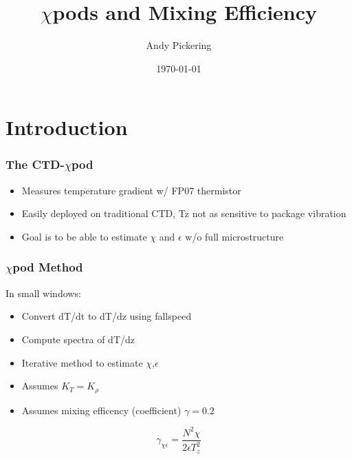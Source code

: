 \documentclass{beamer}
\title{$\chi$pods and Mixing Efficiency}
\author{Andy Pickering}
\date{\today}
\begin{document}
\frame{\titlepage}

\section[Outline]{}
\frame{\tableofcontents}


\section{Introduction}


\begin{frame}
 \frametitle{The CTD-$\chi$pod}

   \begin{itemize}
  \item Measures temperature gradient w/ FP07 thermistor
  \item Easily deployed on traditional CTD, Tz not as sensitive to package vibration
  \item Goal is to be able to estimate $\chi$ and $\epsilon$ w/o full microstructure
  \end{itemize}

\end{frame}


\begin{frame}
 \frametitle{$\chi$pod Method}

In small windows:
   \begin{itemize}
  \item Convert dT/dt to dT/dz using fallspeed
  \item  Compute spectra of dT/dz
  \item Iterative method to estimate $\chi$,$\epsilon$
  \item Assumes $K_T=K_{\rho}$
  \item Assumes mixing efficency (coefficient) $\gamma=0.2$
  \end{itemize}

\begin{equation}
\gamma_{\chi\epsilon}=\frac{N^2 \chi}{2\epsilon T_{z}^{2}} 
\end{equation}

\end{frame}
\end{document}
